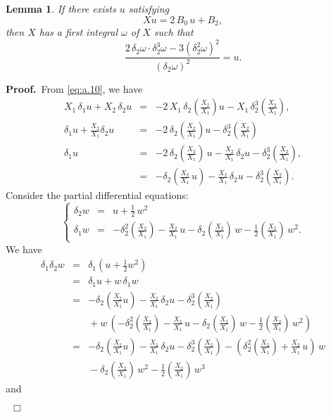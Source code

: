 \documentclass[preprint, 12pt]{elsarticle}
\newtheorem{lem}[thm]{Lemma}
\numberwithin{equation}{section}
\newenvironment{proof}[1][Proof]{\textbf{#1.}\ }{\ $\Box$}
\begin{document}
\begin{lem}
\label{lem:a.15}If there exists $u$ satisfying
\begin{equation} \label{eq:a.10} X u = 2\,B_0\, u  + B_2,
\end{equation}
then $X$ has a first integral $\omega$ of $X$ such that
$$\frac{2\,\delta_2\omega\cdot \delta_2^3\omega - 3(\delta_2^2\omega)^2}{(\delta_2 \omega)^2} = u.$$
\end{lem}
\begin{proof}From \eqref{eq:a.10}, we have
\begin{eqnarray*}
X_1\,\delta_1 u + X_2\,\delta_2 u &=&
-2\,X_1\,\delta_2(\frac{X_2}{X_1})u -
X_1\,\delta_2^3(\frac{X_2}{X_1}),\\
\delta_1u + \frac{X_2}{X_1}\delta_2u&=&-2\,\delta_2(\frac{X_2}{X_1})u - \delta_2^3(\frac{X_2}{X_1})\\
\delta_1 u&=&-2\,\delta_2(\frac{X_2}{X_1})\,u -
\frac{X_2}{X_1}\,\delta_2u - \delta_2^3(\frac{X_2}{X_1}),\\
&=&-\delta_2(\frac{X_2}{X_1}\,u) - \frac{X_2}{X_1}\,\delta_2u -
\delta_2^3(\frac{X_2}{X_1}).
\end{eqnarray*}
Consider the partial differential equations:
\begin{equation}
\label{eq:a.4}\left\{
\begin{array}{rcl}
\delta_2w &=& u + \frac{1}{2}\,w^2\\
\delta_1w &=& -\delta_2^2(\frac{X_2}{X_1})-\frac{X_2}{X_1}\,u -
\delta_2(\frac{X_2}{X_1})\,w - \frac{1}{2}(\frac{X_2}{X_1})\,w^2.
\end{array}\right.
\end{equation}
We have
\begin{eqnarray*}
\delta_1\delta_2w&=&\delta_1(u + \frac{1}{2}w^2)\\
&=&\delta_1u + w\,\delta_1w\\
&=&-\delta_2(\frac{X_2}{X_1}u) - \frac{X_2}{X_1}\,\delta_2u -
\delta_2^3(\frac{X_2}{X_1})\\
&&{} +
w\,\left(-\delta_2^2(\frac{X_2}{X_1})-\frac{X_2}{X_1}\,u -
\delta_2(\frac{X_2}{X_1})\,w -
\frac{1}{2}(\frac{X_2}{X_1})\,w^2\right)\\
&=&-\delta_2(\frac{X_2}{X_1}u) - \frac{X_2}{X_1}\,\delta_2u -
\delta_2^3(\frac{X_2}{X_1}) -
\left(\delta_2^2(\frac{X_2}{X_1})+\frac{X_2}{X_1}\,u\right)\,w\\
&&{} -
\delta_2(\frac{X_2}{X_1})\,w^2 -
\frac{1}{2}(\frac{X_2}{X_1})\,w^3
\end{eqnarray*}
and
\begin{eqnarray*}

\end{eqnarray*}
\end{proof}
\end{document}
